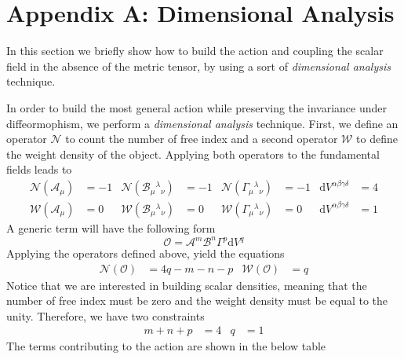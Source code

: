 \documentclass[10pt,a4paper]{article}
\begin{document}
\section{Appendix A: Dimensional Analysis}

In this section we briefly show how to build the action and coupling the scalar field in the absence of the metric tensor, by using a sort of
\textit{dimensional analysis} technique.

In order to build the most general action while preserving the invariance under diffeormophism, we perform a \textit{dimensional analysis} technique. First,
we define an operator $\mathcal{N}$ to count the number of free index  and a second operator $\mathcal{W}$ to define the weight density of the object. Applying both
operators to the fundamental fields leads to
\begin{align}
  \mathcal{N}(\mathcal{A}_\mu)& = -1 & \mathcal{N}(\mathcal{B}_{\mu}{}^{\lambda}{}_{\nu})& = -1 & \mathcal{N}(\Gamma_{\mu}{}^{\lambda}{}_{\nu})& = -1 & \mathrm{d}V^{\alpha\beta\gamma\delta}& = 4 \\
  \mathcal{W}(\mathcal{A}_\mu)& = 0 & \mathcal{W}(\mathcal{B}_{\mu}{}^{\lambda}{}_{\nu})& = 0 & \mathcal{W}(\Gamma_{\mu}{}^{\lambda}{}_{\nu})& = 0 & \mathrm{d}V^{\alpha\beta\gamma\delta}& = 1 
\end{align}
A generic term will have the following form
\begin{equation}
  \mathcal{O} = \mathcal{A}^m\mathcal{B}^n\Gamma^p\mathrm{d}V^q
\end{equation}
Applying the operators defined above, yield the equations
\begin{align}
  \mathcal{N}(\mathcal{O}) & = 4q - m - n - p & \mathcal{W}(\mathcal{O}) & = q 
\end{align}
Notice that we are interested in building scalar densities, meaning that the number of free index must be zero and the weight density must be equal to the unity. Therefore,
we have two constraints
\begin{align}
  m + n + p & = 4 & q & = 1
\end{align}
The terms contributing to the action are shown in the below table
\end{document}
